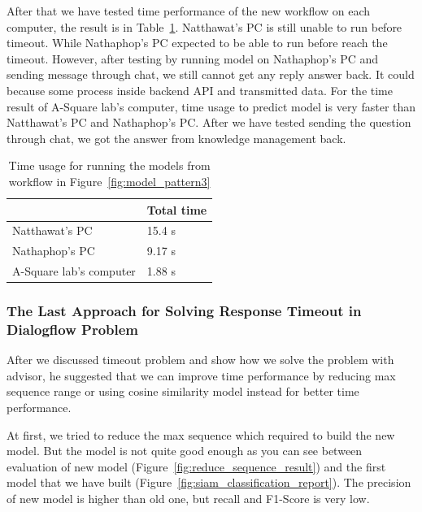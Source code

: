 \documentclass[12pt,oneside,openright,a4paper]{cpe-english-project}
\begin{document}
After that we have tested time performance of the new workflow on each computer,
the result is in Table~\ref*{tab:run_time_pattern3_table}.
Natthawat's PC is still unable to run before timeout.
While Nathaphop's PC expected to be able to run before reach the timeout.
However, after testing by running model on Nathaphop's PC and sending message through chat,
we still cannot get any reply answer back. It could because some process inside backend API and transmitted data.
For the time result of A-Square lab's computer, time usage to predict model is very faster than
Natthawat's PC and Nathaphop's PC.
After we have tested sending the question through chat, we got the answer from knowledge management back.

\begin{table}[h]
	\centering
	\caption{Time usage for running the models from workflow in Figure~\ref*{fig:model_pattern3}}
	\label{tab:run_time_pattern3_table}
	\begin{adjustbox}{width=\textwidth}
		\begin{tabular}{|l|l|}
			\hline
			\backslashbox{Computer name}{Time usage to predict each model} &Total time \\ \hline
			Natthawat's PC & 15.4 s \\ \hline
			Nathaphop's PC & 9.17 s \\ \hline
			A-Square lab's computer & 1.88 s \\ \hline
		\end{tabular}
	\end{adjustbox}
\end{table}

\pagebreak
\subsubsection{The Last Approach for Solving Response Timeout in Dialogflow Problem}
After we discussed timeout problem and show how we solve the problem with advisor,
he suggested that we can improve time performance by reducing max sequence range or using
cosine similarity model instead for better time performance.

At first, we tried to reduce the max sequence which required to build the new model.
But the model is not quite good enough as you can see between evaluation of new model
(Figure~\ref*{fig:reduce_sequence_result}) and the first model that we have built
(Figure~\ref*{fig:siam_classification_report}). The precision of new model is higher than old
one, but recall and F1-Score is very low.
\end{document}
